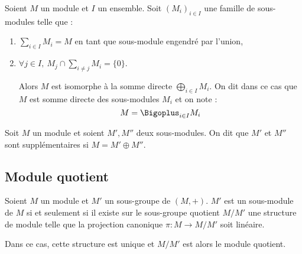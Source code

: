 \begin{prop}

Soient $M$ un module et $I$ un ensemble. Soit $(M_i)_{i\in I}$ une famille de
sous-modules telle que :
\begin{enumerate}
 \item $\sum_{i\in I} M_i = M$ en tant que sous-module engendré par l'union,
 \item $\forall j\in I,\ M_j\cap \sum_{i\neq j} M_i = \{0\}$.
 
 Alors $M$ est isomorphe à la somme directe $\bigoplus_{i\in I} M_i$.
 On dit dans ce cas que $M$ est somme directe des sous-modules $M_i$ et on note
: \begin{displaymath}
   M=\Bigoplus_{i\in I} M_i
  \end{displaymath}
\end{enumerate}
\end{prop}

\begin{defi}[Supplémentaire]
 
 Soit $M$ un module et soient $M',M''$ deux sous-modules. On dit que $M'$ et
$M''$ sont supplémentaires si $M=M'\oplus M''$.
\end{defi}

\subsection{Module quotient}
\vspace{0.5em}

\begin{defiprop}
 
 Soient $M$ un module et $M'$ un sous-groupe de $(M,+)$. $M'$ est un
sous-module de $M$ si et seulement si il existe sur le sous-groupe quotient
$M/M'$ une structure de module telle que la projection canonique $\pi : M
\rightarrow M/M'$ soit linéaire.

Dans ce cas, cette structure est unique et $M/M'$ est alors le module quotient.
\end{defiprop}

